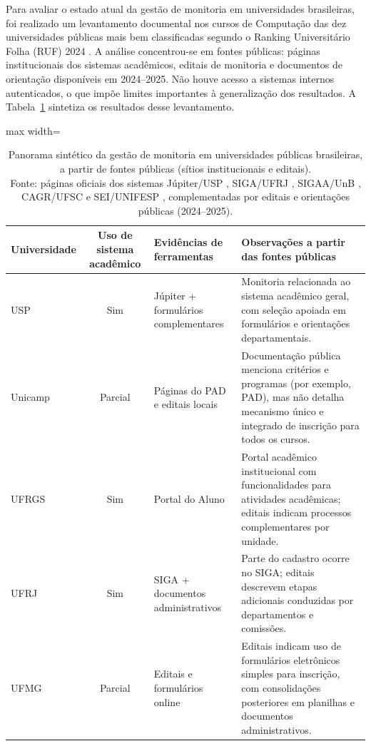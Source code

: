 \documentclass[portuguese]{sbc2025}%
\begin{document}
Para avaliar o estado atual da gestão de monitoria em universidades brasileiras, foi realizado um levantamento documental nos cursos de Computação das dez universidades públicas mais bem classificadas segundo o Ranking Universitário Folha (RUF) 2024 \cite{folha2024ruf}. A análise concentrou-se em fontes públicas: páginas institucionais dos sistemas acadêmicos, editais de monitoria e documentos de orientação disponíveis em 2024--2025. Não houve acesso a sistemas internos autenticados, o que impõe limites importantes à generalização dos resultados. A Tabela~\ref{tab:estado-pratica} sintetiza os resultados desse levantamento.

\begin{table}[htb]
  \centering
\caption{Panorama sintético da gestão de monitoria em universidades públicas brasileiras, a partir de fontes públicas (sítios institucionais e editais).\\Fonte: páginas oficiais dos sistemas Júpiter/USP \cite{USPJupiter}, SIGA/UFRJ \cite{UFRJ_SIGA}, SIGAA/UnB \cite{UnB_SIGAA}, CAGR/UFSC \cite{UFSC_CAGR} e SEI/UNIFESP \cite{UNIFESP_SEI}, complementadas por editais e orientações públicas (2024--2025).}
  \label{tab:estado-pratica}
  \begin{adjustbox}{max width=\textwidth}
    \begin{tabular}{|l|c|p{3.5cm}|p{6cm}|}
      \hline
      \textbf{Universidade} & \textbf{Uso de sistema acadêmico} & \textbf{Evidências de ferramentas} & \textbf{Observações a partir das fontes públicas} \\
      \hline
      USP     & Sim    & Júpiter + formulários complementares & Monitoria relacionada ao sistema acadêmico geral, com seleção apoiada em formulários e orientações departamentais. \\
      \hline
      Unicamp & Parcial & Páginas do PAD e editais locais     & Documentação pública menciona critérios e programas (por exemplo, PAD), mas não detalha mecanismo único e integrado de inscrição para todos os cursos. \\
      \hline
      UFRGS   & Sim    & Portal do Aluno                      & Portal acadêmico institucional com funcionalidades para atividades acadêmicas; editais indicam processos complementares por unidade. \\
      \hline
      UFRJ    & Sim    & SIGA + documentos administrativos    & Parte do cadastro ocorre no SIGA; editais descrevem etapas adicionais conduzidas por departamentos e comissões. \\
      \hline
      UFMG    & Parcial & Editais e formulários online         & Editais indicam uso de formulários eletrônicos simples para inscrição, com consolidações posteriores em planilhas e documentos administrativos. \\

\end{tabular}
\end{adjustbox}
\end{table}
\end{document}
